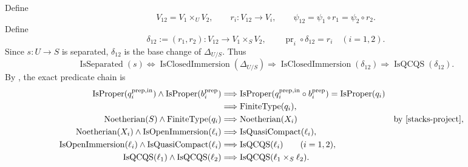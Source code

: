 \begin{definition}
  \label{def:nagata-two-open-comparison-space}

  Define
  \[
    V_{12}=V_1\times_UV_2,\qquad
    r_i\colon V_{12}\to V_i,\qquad
    \psi_{12}=\psi_1\circ r_1=\psi_2\circ r_2.
  \]
  Define
  \[
    \delta_{12}:=(r_1,r_2)\colon V_{12}\to V_1\times_SV_2,
    \qquad
    \operatorname{pr}_i\circ\delta_{12}=r_i\quad(i=1,2).
  \]
  Since $s\colon U\to S$ is separated,
  $\delta_{12}$ is the base change of $\Delta_{U/S}$.  Thus
  \[
    \operatorname{IsSeparated}(s)
      \Longleftrightarrow
        \operatorname{IsClosedImmersion}(\Delta_{U/S})
      \Longrightarrow
        \operatorname{IsClosedImmersion}(\delta_{12})
      \Longrightarrow
        \operatorname{IsQCQS}(\delta_{12}).
  \]
  By ,
  the exact predicate chain is
  \[
  \begin{aligned}
    \operatorname{IsProper}(q_i^{\mathrm{prep,in}})\wedge
      \operatorname{IsProper}(b_i^{\mathrm{prep}})
      &\Longrightarrow
        \operatorname{IsProper}
          (q_i^{\mathrm{prep,in}}\circ b_i^{\mathrm{prep}})
       =\operatorname{IsProper}(q_i)\\
      &\Longrightarrow\operatorname{FiniteType}(q_i),\\
    \operatorname{Noetherian}(S)\wedge\operatorname{FiniteType}(q_i)
      &\Longrightarrow\operatorname{Noetherian}(X_i)
       &&\text{by \cite[Tag 01T6]{stacks-project}},\\
    \operatorname{Noetherian}(X_i)\wedge
      \operatorname{IsOpenImmersion}(\ell_i)
      &\Longrightarrow\operatorname{IsQuasiCompact}(\ell_i),\\
    \operatorname{IsOpenImmersion}(\ell_i)\wedge
      \operatorname{IsQuasiCompact}(\ell_i)
      &\Longrightarrow\operatorname{IsQCQS}(\ell_i)
      \qquad(i=1,2),\\
    \operatorname{IsQCQS}(\ell_1)\wedge
      \operatorname{IsQCQS}(\ell_2)
      &\Longrightarrow
        \operatorname{IsQCQS}(\ell_1\times_S\ell_2).
  \end{aligned}
  \]

\end{definition}
